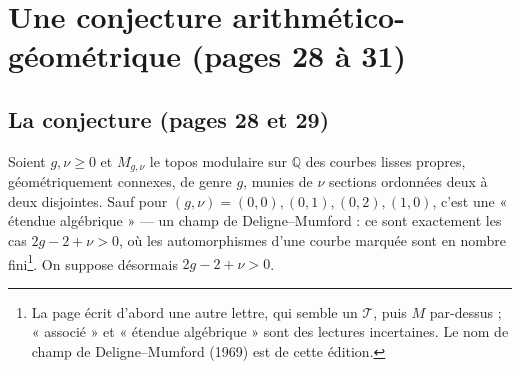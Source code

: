 \documentclass[11pt,a4paper]{article}
\begin{document}
\section*{Une conjecture arithmético-géométrique (pages 28 à 31)}

\subsection*{La conjecture (pages 28 et 29)}

Soient $g, \nu \geq 0$ et $M_{g,\nu}$ le topos modulaire sur $\mathbb{Q}$ des
courbes lisses propres, géométriquement connexes, de genre $g$, munies de $\nu$
sections ordonnées deux à deux disjointes. Sauf pour $(g, \nu) = (0, 0), (0,
1), (0, 2), (1, 0)$, c'est une « étendue algébrique » — un champ de
Deligne--Mumford : ce sont exactement les cas $2g - 2 + \nu > 0$, où les
automorphismes d'une courbe marquée sont en nombre fini\footnote{La page écrit
d'abord une autre lettre, qui semble un $\mathcal{T}$, puis $M$ par-dessus ;
« associé » et « étendue algébrique » sont des lectures incertaines. Le nom de
champ de Deligne--Mumford (1969) est de cette édition.}. On suppose désormais
$2g - 2 + \nu > 0$.
\end{document}
